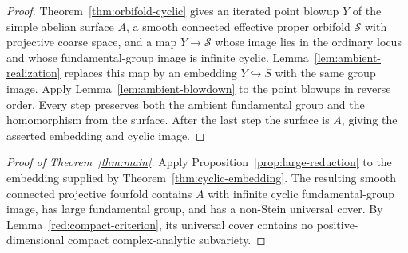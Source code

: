 \documentclass[11pt,reqno]{amsart}
\numberwithin{equation}{section}
\theoremstyle{definition}
\theoremstyle{remark}
\newcommand{\cS}{\mathcal S}
\begin{document}
\begin{proof}
Theorem~\ref{thm:orbifold-cyclic} gives an iterated point blowup $Y$ of
the simple abelian surface $A$, a smooth connected effective proper
orbifold $\cS$ with projective coarse space, and a map $Y\to\cS$
whose image lies in the ordinary locus and whose fundamental-group
image is infinite cyclic.  Lemma~\ref{lem:ambient-realization} replaces
this map by an embedding $Y\hookrightarrow S$ with the same group
image.  Apply Lemma~\ref{lem:ambient-blowdown} to the point blowups in
reverse order.  Every step preserves both the ambient fundamental
group and the homomorphism from the surface.  After the last step the
surface is $A$, giving the asserted embedding and cyclic image.
\end{proof}

\begin{samepage}
\begin{proof}[Proof of Theorem~\ref{thm:main}]
Apply Proposition~\ref{prop:large-reduction} to the embedding supplied
by Theorem~\ref{thm:cyclic-embedding}.  The resulting smooth connected
projective fourfold contains $A$ with infinite cyclic fundamental-group
image, has large fundamental group, and has a non-Stein universal cover.  By Lemma~\ref{red:compact-criterion}, its universal
cover contains no positive-dimensional compact complex-analytic
subvariety.
\end{proof}
\end{samepage}



\end{document}
